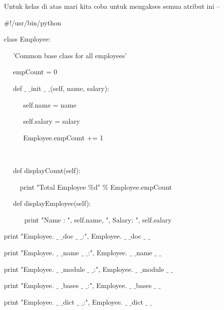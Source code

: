 {Untuk kelas di atas mari kita coba untuk mengakses semua atribut ini – \par
\vspace{12pt}
\noindent 
 $  \#  $!/usr/bin/python \par
\vspace{12pt}
\noindent 
class Employee: \par
\noindent 
~~ 'Common base class for all employees' \par
\noindent 
~~ empCount = 0 \par
\vspace{12pt}
\noindent 
~~ def  $  \_  $ $  \_  $init $  \_  $ $  \_  $(self, name, salary): \par
\noindent 
~~~~~ self.name = name \par
\noindent 
~~~~~ self.salary = salary \par
\noindent 
~~~~~ Employee.empCount += 1 \par
\noindent 
~~  \par
\noindent 
~~ def displayCount(self): \par
\noindent 
~~~~ print "Total Employee  $  \%  $d"  $  \%  $ Employee.empCount \par
\vspace{12pt}
\noindent 
~~ def displayEmployee(self): \par
\noindent 
~~~~~~print "Name : ", self.name,  ", Salary: ", self.salary \par
\vspace{12pt}
\noindent 
print "Employee. $  \_  $ $  \_  $doc $  \_  $ $  \_  $:", Employee. $  \_  $ $  \_  $doc $  \_  $ $  \_  $ \par
\noindent 
print "Employee. $  \_  $ $  \_  $name $  \_  $ $  \_  $:", Employee. $  \_  $ $  \_  $name $  \_  $ $  \_  $ \par
\noindent 
print "Employee. $  \_  $ $  \_  $module $  \_  $ $  \_  $:", Employee. $  \_  $ $  \_  $module $  \_  $ $  \_  $ \par
\noindent 
print "Employee. $  \_  $ $  \_  $bases $  \_  $ $  \_  $:", Employee. $  \_  $ $  \_  $bases $  \_  $ $  \_  $ \par
\noindent 
print "Employee. $  \_  $ $  \_  $dict $  \_  $ $  \_  $:", Employee. $  \_  $ $  \_  $dict $  \_  $ $  \_  $ \par
\vspace{12pt}
\vspace{12pt}
\noindent 

}
